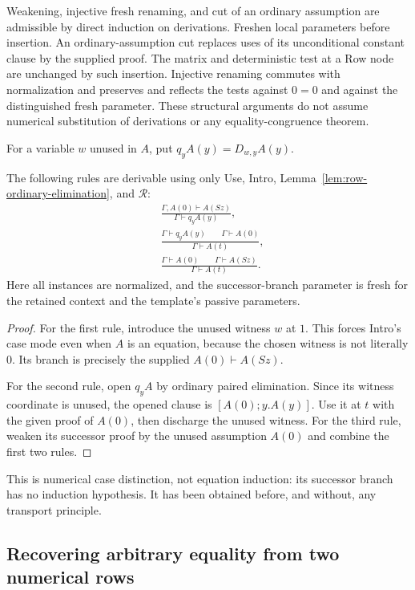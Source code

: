 Weakening, injective fresh renaming, and cut of an ordinary assumption
are admissible by direct induction on derivations.  Freshen local
parameters before insertion.  An ordinary-assumption cut replaces uses
of its unconditional constant clause by the supplied proof.  The matrix
and deterministic test at a Row node are unchanged by such insertion.
Injective renaming commutes with normalization and preserves and reflects
the tests against $0=0$ and against the distinguished fresh parameter.
These structural arguments do not assume numerical substitution of
derivations or any equality-congruence theorem.

For a variable $w$ unused in $A$, put
$q_yA(y)=D_{w,y}A(y)$.

\begin{lemma}
\label{lem:row-cases}
The following rules are derivable using only Use, Intro,
Lemma~\ref{lem:row-ordinary-elimination}, and $\mathcal R$:
\begin{align*}
 &\frac{\Gamma,A(0)\vdash A(Sz)}
        {\Gamma\vdash q_yA(y)},\\[4pt]
 &\frac{\Gamma\vdash q_yA(y)\qquad\Gamma\vdash A(0)}
        {\Gamma\vdash A(t)},\\[4pt]
 &\frac{\Gamma\vdash A(0)\qquad\Gamma\vdash A(Sz)}
        {\Gamma\vdash A(t)}.
\end{align*}
Here all instances are normalized, and the successor-branch parameter is
fresh for the retained context and the template's passive parameters.
\end{lemma}
\begin{proof}
For the first rule, introduce the unused witness $w$ at $1$.  This forces
Intro's case mode even when $A$ is an equation, because the chosen
witness is not literally $0$.  Its branch is precisely the supplied
$A(0)\vdash A(Sz)$.

For the second rule, open $q_yA$ by ordinary paired elimination.  Since
its witness coordinate is unused, the opened clause is
$[A(0);y.A(y)]$.  Use it at $t$ with the given proof of $A(0)$, then
discharge the unused witness.  For the third rule, weaken its successor
proof by the unused assumption $A(0)$ and combine the first two rules.
\end{proof}

This is numerical case distinction, not equation induction: its
successor branch has no induction hypothesis.  It has been obtained
before, and without, any transport principle.

\subsection{Recovering arbitrary equality from two numerical rows}

